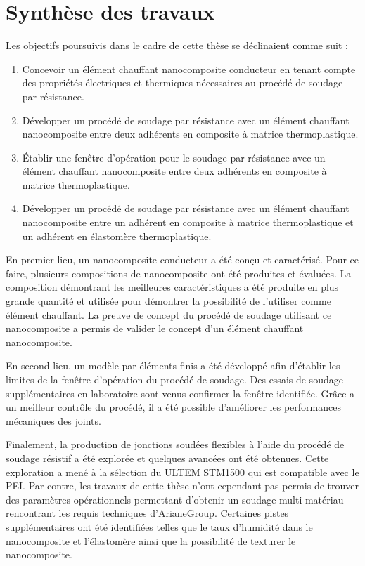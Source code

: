 \label{sec:Discussion}

\section{Synthèse des travaux}

Les objectifs poursuivis dans le cadre de cette thèse se déclinaient comme suit : 

\begin{enumerate}
	\item Concevoir un élément chauffant nanocomposite conducteur en tenant compte des propriétés électriques et thermiques nécessaires au procédé de soudage par résistance. 
	\item Développer un procédé de soudage par résistance avec un élément chauffant nanocomposite entre deux adhérents en composite à matrice thermoplastique. 
	\item Établir une fenêtre d'opération pour le soudage par résistance avec un élément chauffant nanocomposite entre deux adhérents en composite à matrice thermoplastique. 
	\item Développer un procédé de soudage par résistance avec un élément chauffant nanocomposite entre un adhérent en composite à matrice thermoplastique et un adhérent en élastomère thermoplastique. 
\end{enumerate}

En premier lieu, un nanocomposite conducteur a été conçu et caractérisé. 
Pour ce faire, plusieurs compositions de nanocomposite ont été produites et évaluées. 
La composition démontrant les meilleures caractéristiques a été produite en plus grande quantité et utilisée pour démontrer la possibilité de l'utiliser comme élément chauffant. 
La preuve de concept du procédé de soudage utilisant ce nanocomposite a permis de valider le concept d'un élément chauffant nanocomposite. 

En second lieu, un modèle par éléments finis a été développé afin d'établir les limites de la fenêtre d'opération du procédé de soudage. 
Des essais de soudage supplémentaires en laboratoire sont venus confirmer la fenêtre identifiée. 
Grâce a un meilleur contrôle du procédé, il a été possible d'améliorer les performances mécaniques des joints. 

Finalement, la production de jonctions soudées flexibles à l'aide du procédé de soudage résistif a été explorée et quelques avancées ont été obtenues. 
Cette exploration a mené à la sélection du ULTEM STM1500 qui est compatible avec le PEI. 
Par contre, les travaux de cette thèse n'ont cependant pas permis de trouver des paramètres opérationnels permettant d'obtenir un soudage multi matériau rencontrant les requis techniques d'ArianeGroup. 
Certaines pistes supplémentaires ont été identifiées telles que le taux d'humidité dans le nanocomposite et l'élastomère ainsi que la possibilité de texturer le nanocomposite. 

